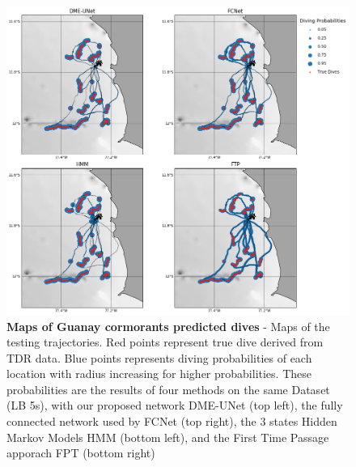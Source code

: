 \documentclass{article}
\begin{document}
\begin{figure}[h]
  \centering
  \includegraphics[scale=0.5]{figure4b.png}
  \caption{\textbf{Maps of Guanay cormorants predicted dives} - Maps of the testing trajectories. Red points represent true dive derived from TDR data. Blue points represents diving probabilities of each location with radius increasing for higher probabilities. These probabilities are the results of four methods on the same Dataset (LB 5s), with our proposed network DME-UNet (top left), the fully connected network used by \citep{browning_predicting_2018}  FCNet (top right), the 3 states Hidden Markov Models HMM (bottom left), and the First Time Passage apporach FPT (bottom right)}
  \label{figure4b}
\end{figure}
\end{document}
